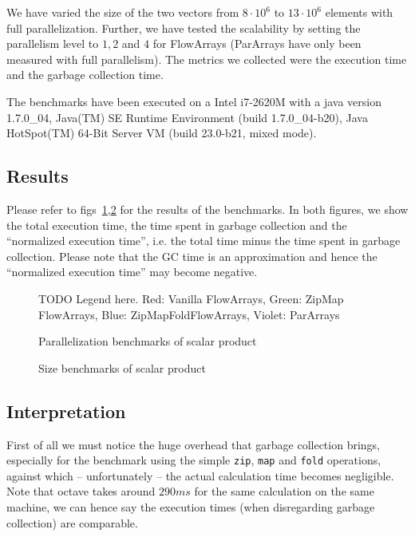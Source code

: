 \documentclass[runningheads,a4paper,fleqn]{llncs}
\begin{document}
We have varied the size of the two vectors from $8 \cdot 10^6$ to $13
\cdot 10^6$ elements with full parallelization. Further, we have
tested the scalability by setting the parallelism level to $1,2$ and
$4$ for FlowArrays (ParArrays have only been measured with full
parallelism). The metrics we collected were the execution time and the
garbage collection time.

The benchmarks have been executed on a Intel i7-2620M with a java
version 1.7.0\_04, Java(TM) SE Runtime Environment (build
1.7.0\_04-b20), Java HotSpot(TM) 64-Bit Server VM (build 23.0-b21,
mixed mode).

\subsection{Results}

Please refer to figs~\ref{fig:par-bench},\ref{fig:size-bench} for the
results of the benchmarks. In both figures, we show the total
execution time, the time spent in garbage collection and the
``normalized execution time'', i.e. the total time minus the time
spent in garbage collection. Please note that the GC time is an
approximation and hence the ``normalized execution time'' may become
negative.

\begin{figure}
TODO Legend here. Red: Vanilla
    FlowArrays, Green: ZipMap FlowArrays, Blue: ZipMapFoldFlowArrays,
    Violet: ParArrays
\caption{Parallelization benchmarks of scalar product}
\label{fig:par-bench}
\end{figure}

\begin{figure}
\caption{Size benchmarks of scalar product}
\label{fig:size-bench}
\end{figure}

\subsection{Interpretation}
First of all we must notice the huge overhead that garbage collection
brings, especially for the benchmark using the simple \texttt{zip},
\texttt{map} and \texttt{fold} operations, against which --
unfortunately -- the actual calculation time becomes negligible. Note
that octave \cite{octave} takes around $290 ms$ for the same
calculation on the same machine, we can hence say the execution times
(when disregarding garbage collection) are comparable.
\end{document}
